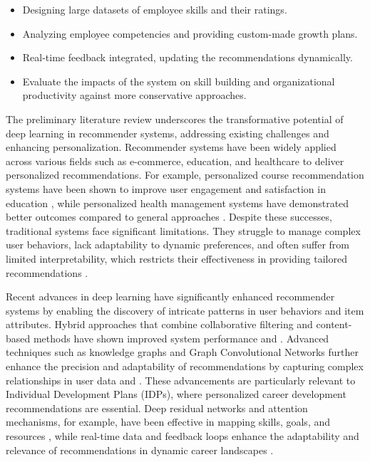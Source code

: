 \begin{itemize}
    \item Designing large datasets of employee skills and their ratings.
    \item Analyzing employee competencies and providing custom-made growth plans.
    \item Real-time feedback integrated, updating the recommendations dynamically.
    \item Evaluate the impacts of the system on skill building and organizational productivity against more conservative approaches.
\end{itemize}

The preliminary literature review underscores the transformative potential of deep learning in recommender systems, addressing existing challenges and enhancing personalization. Recommender systems have been widely applied across various fields such as e-commerce, education, and healthcare to deliver personalized recommendations. For example, personalized course recommendation systems have been shown to improve user engagement and satisfaction in education \cite{gulzar2018pcrs}, while personalized health management systems have demonstrated better outcomes compared to general approaches \cite{erturkmen2019collaborative}. Despite these successes, traditional systems face significant limitations. They struggle to manage complex user behaviors, lack adaptability to dynamic preferences, and often suffer from limited interpretability, which restricts their effectiveness in providing tailored recommendations \cite{sahoo2019deepreco}.

Recent advances in deep learning have significantly enhanced recommender systems by enabling the discovery of intricate patterns in user behaviors and item attributes. Hybrid approaches that combine collaborative filtering and content-based methods have shown improved system performance \cite{mu2018survey} and \cite{li2024attention}. Advanced techniques such as knowledge graphs and Graph Convolutional Networks further enhance the precision and adaptability of recommendations by capturing complex relationships in user data \cite{chen2024intelligent} and \cite{li2024attention}. These advancements are particularly relevant to Individual Development Plans (IDPs), where personalized career development recommendations are essential. Deep residual networks and attention mechanisms, for example, have been effective in mapping skills, goals, and resources \cite{li2024attention}, while real-time data and feedback loops enhance the adaptability and relevance of recommendations in dynamic career landscapes \cite{wang2020personalized}.

